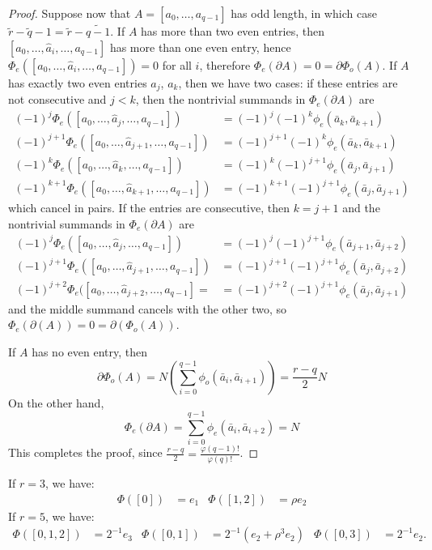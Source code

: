 \begin{proof}
	Suppose now that $A = [a_0,\dots,a_{q-1}]$ has odd length, in which case $\tilde{r}-\tilde{q}-1 = \tilde{r}-\widetilde{q-1} $. If $A$ has more than two even entries, then $[a_0,\dots,\hat{a}_i,\dots,a_{q-1}]$ has more than one even entry, hence $\Phi_e([a_0,\dots,\hat{a}_i,\dots,a_{q-1}]) = 0$ for all $i$, therefore $\Phi_e(\partial A) = 0 = \partial \Phi_o(A)$. If $A$ has exactly two even entries $a_j$, $a_k$, then we have two cases: if these entries are not consecutive and $j<k$, then the nontrivial summands in $ \Phi_e(\partial A)$ are
	\begin{align*}
		(-1)^j\Phi_e([a_0,\dots,\hat{a}_j,\dots,a_{q-1}]) &= (-1)^j(-1)^{k}\phi_e(\bar a_k,\bar a_{k+1}) \\
		(-1)^{j+1}\Phi_e([a_0,\dots,\hat{a}_{j+1},\dots,a_{q-1}]) &= (-1)^{j+1}(-1)^{k}\phi_e(\bar a_k,\bar a_{k+1})
		\\
		(-1)^{k}\Phi_e([a_0,\dots,\hat{a}_k,\dots,a_{q-1}]) &= (-1)^k(-1)^{j+1}\phi_e(\bar a_j,\bar a_{j+1}) \\
		(-1)^{k+1}\Phi_e([a_0,\dots,\hat{a}_{k+1},\dots,a_{q-1}]) &= (-1)^{k+1}(-1)^{j+1}\phi_e(\bar a_j,\bar a_{j+1})
	\end{align*}
	which cancel in pairs. If the entries are consecutive, then $k=j+1$ and the nontrivial summands in $\Phi_e(\partial A)$ are
	\begin{align*}
		(-1)^j\Phi_e([a_0,\dots,\hat{a}_j,\dots,a_{q-1}]) &= (-1)^{j}(-1)^{j+1}\phi_e(\bar a_{j+1},\bar a_{j+2}) \\
		(-1)^{j+1}\Phi_e([a_0,\dots,\hat{a}_{j+1},\dots,a_{q-1}]) &= (-1)^{j+1}(-1)^{j+1}\phi_e(\bar a_j,\bar a_{j+2}) \\
		(-1)^{j+2}\Phi_e([a_0,\dots,\hat{a}_{j+2},\dots,a_{q-1}]= &= (-1)^{j+2}(-1)^{j+1}\phi_e(\bar a_j,\bar a_{j+1})
	\end{align*}
	and the middle summand cancels with the other two, so $\Phi_e(\partial (A)) = 0 = \partial(\Phi_o(A))$.

	If $A$ has no even entry, then
	\[
	\partial \Phi_o(A) = N\left(\sum_{i=0}^{q-1} \phi_o(\bar a_i,\bar a_{i+1})\right) = \frac{r-q}{2}N
	\]
	On the other hand,
	\[
	\Phi_e(\partial A)
	= \sum_{i=0}^{q-1} \phi_e(\bar a_i,\bar a_{i+2})
	= N
	\]
	This completes the proof, since $\frac{r-q}{2} = \frac{\varphi(q-1)!}{\varphi(q)!}$.
\end{proof}

\begin{example}\label{example:Phi}
If $r=3$, we have:
\begin{align*}
\Phi([0]) &= e_1
&
\Phi([1,2]) &= \rho e_2
\end{align*}
If $r=5$, we have:
\begin{align*}
\Phi([0,1,2]) &= 2^{-1}e_3
&
\Phi([0,1]) &= 2^{-1}(e_2 + \rho^3e_2)
&
\Phi([0,3]) &= 2^{-1}e_2.
\end{align*}
\end{example}

